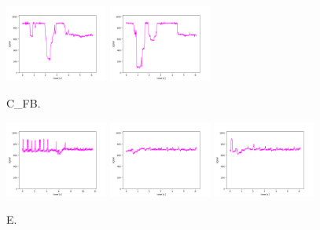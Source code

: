 \begin{figure}[!ht]
\begin{center}
\includegraphics[width=0.3\textwidth]{../data/C_FB/C_FB_2.png}
\includegraphics[width=0.3\textwidth]{../data/C_FB/C_FB_3.png}
\caption{C\_FB.\label{fig:C_FB}}
\end{center}
\end{figure}

\begin{figure}[!ht]
\begin{center}
\includegraphics[width=0.3\textwidth]{../data/E2/E2_1.png}
\includegraphics[width=0.3\textwidth]{../data/E2/E2_2.png}
\includegraphics[width=0.3\textwidth]{../data/E2/E2_3.png}
\caption{E.\label{fig:C_FB}}
\end{center}
\end{figure}





